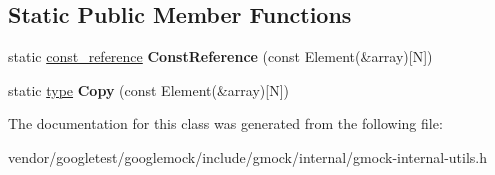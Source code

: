 \subsection*{Static Public Member Functions}
\begin{DoxyCompactItemize}
\item 
\mbox{\label{classtesting_1_1internal_1_1_stl_container_view_3_01_element[_n]_4_aa1b15d7f43d38751ae19f6dbdcb6aba3}} 
static \mbox{\hyperlink{classtesting_1_1internal_1_1_native_array}{const\+\_\+reference}} {\bfseries Const\+Reference} (const Element(\&array)\mbox{[}N\mbox{]})
\item 
\mbox{\label{classtesting_1_1internal_1_1_stl_container_view_3_01_element[_n]_4_af2cf79fbd7f829229a47b52f863c68f8}} 
static \mbox{\hyperlink{classtesting_1_1internal_1_1_native_array}{type}} {\bfseries Copy} (const Element(\&array)\mbox{[}N\mbox{]})
\end{DoxyCompactItemize}


The documentation for this class was generated from the following file\+:\begin{DoxyCompactItemize}
\item 
vendor/googletest/googlemock/include/gmock/internal/gmock-\/internal-\/utils.\+h\end{DoxyCompactItemize}
